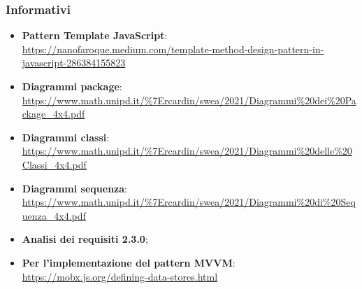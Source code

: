     \subsubsection{Informativi}
	\begin{itemize}
		\item \textbf{Pattern Template JavaScript}:  \href{https://nanofaroque.medium.com/template-method-design-pattern-in-javascript-286384155823}{https://nanofaroque.medium.com/template-method-design-pattern-in-javascript-286384155823}
		\item \textbf{Diagrammi package}: \\ \href{https://www.math.unipd.it/\%7Ercardin/swea/2021/Diagrammi\%20dei\%20Package_4x4.pdf}{https://www.math.unipd.it/\%7Ercardin/swea/2021/Diagrammi\%20dei\%20Package_4x4.pdf}
		\item \textbf{Diagrammi classi}: \\ \href{https://www.math.unipd.it/\%7Ercardin/swea/2021/Diagrammi\%20delle\%20Classi_4x4.pdf}{https://www.math.unipd.it/\%7Ercardin/swea/2021/Diagrammi\%20delle\%20Classi_4x4.pdf}
		\item \textbf{Diagrammi sequenza}: \\ \href{https://www.math.unipd.it/\%7Ercardin/swea/2021/Diagrammi\%20di\%20Sequenza_4x4.pdf}{https://www.math.unipd.it/\%7Ercardin/swea/2021/Diagrammi\%20di\%20Sequenza_4x4.pdf}
		\item \textbf{Analisi dei requisiti 2.3.0};
		\item \textbf{Per l'implementazione del pattern MVVM}: \url{https://mobx.js.org/defining-data-stores.html}
		
	\end{itemize}